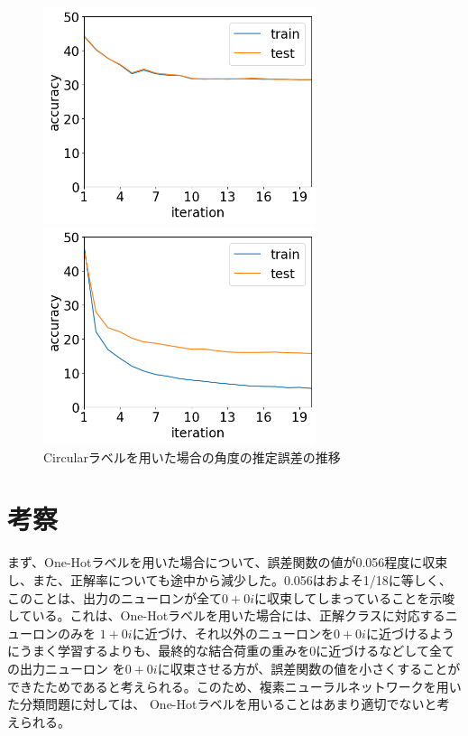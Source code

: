 \documentclass[11pt,a4paper,uplatex]{ujarticle}
\begin{document}
  \begin{figure}[tbp]
    \begin{minipage}[b]{0.495\textwidth}
      \centering
      \includegraphics[keepaspectratio, width=80mm]{Images/python/avg_202402052108.png}
    \end{minipage}
    \begin{minipage}[b]{0.495\textwidth}
      \centering
      \includegraphics[keepaspectratio, width=80mm]{Images/python/avg_202402052149.png}
    \end{minipage}
    \caption{Circularラベルを用いた場合の角度の推定誤差の推移}
    \label{fig:avg_circular}
  \end{figure}
\section{考察}

  まず、One-Hotラベルを用いた場合について、誤差関数の値が0.056程度に収束し、また、正解率についても途中から減少した。0.056はおよそ1/18に等しく、
  このことは、出力のニューロンが全て$0 + 0i$に収束してしまっていることを示唆している。これは、One-Hotラベルを用いた場合には、正解クラスに対応するニューロンのみを
  $1 + 0i$に近づけ、それ以外のニューロンを$0 + 0i$に近づけるようにうまく学習するよりも、最終的な結合荷重の重みを0に近づけるなどして全ての出力ニューロン
  を$0 + 0i$に収束させる方が、誤差関数の値を小さくすることができたためであると考えられる。このため、複素ニューラルネットワークを用いた分類問題に対しては、
  One-Hotラベルを用いることはあまり適切でないと考えられる。
  
\end{document}
